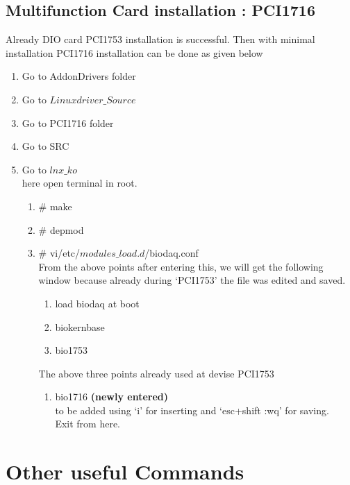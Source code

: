 \subsection{Multifunction Card installation : PCI1716}
Already DIO card PCI1753 installation is successful. Then with minimal installation PCI1716 installation can be done as given below
\begin{enumerate}
	\item [\textbullet] Go to AddonDrivers folder
	\item [\textbullet] Go to $Linuxdriver\_Source$ 
	\item [\textbullet] Go to PCI1716 folder
	\item [\textbullet] Go to SRC
	\item [\textbullet] Go to $lnx\_ko$ \\
	here open terminal in root. 
		\begin{enumerate}
			\item $\#$ make
			\item $\#$ depmod
			\item $\#$ vi/etc/$modules\_load.d$/biodaq.conf\\
			From the above points after entering this, we will get the following window because already during `PCI1753' the file was edited and saved.
			\begin{enumerate}
				\item load biodaq at boot
				\item biokernbase
				\item bio1753
			\end{enumerate}
			The above three points already used at devise PCI1753 
			\begin{enumerate}
				\item bio1716 \textbf{(newly entered)}\\
				 to be added using `i' for inserting and `esc+shift :wq' for saving.\\
				 Exit from here.
			\end{enumerate}	 
		\end{enumerate}
\end{enumerate}

\section{Other useful Commands}

